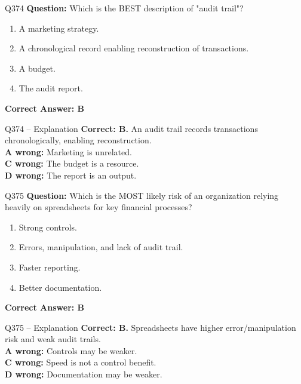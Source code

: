 \documentclass[aspectratio=169,10pt]{beamer}
\begin{document}
	\begin{frame}[t]{Q374}
		\small
		\textbf{Question:} Which is the BEST description of "audit trail"?
		\begin{enumerate}[label=\Alph*.,itemsep=1pt,topsep=2pt]
			\item A marketing strategy.
			\item A chronological record enabling reconstruction of transactions.
			\item A budget.
			\item The audit report.
		\end{enumerate}
		\vspace{4pt}
		\textbf{Correct Answer: B}
	\end{frame}
	
	\begin{frame}[t]{Q374 -- Explanation}
		\small
		\textbf{Correct: B.} An audit trail records transactions chronologically, enabling reconstruction. \\[4pt]
		\textbf{A wrong:} Marketing is unrelated. \\[2pt]
		\textbf{C wrong:} The budget is a resource. \\[2pt]
		\textbf{D wrong:} The report is an output.
	\end{frame}
	
	\begin{frame}[t]{Q375}
		\small
		\textbf{Question:} Which is the MOST likely risk of an organization relying heavily on spreadsheets for key financial processes?
		\begin{enumerate}[label=\Alph*.,itemsep=1pt,topsep=2pt]
			\item Strong controls.
			\item Errors, manipulation, and lack of audit trail.
			\item Faster reporting.
			\item Better documentation.
		\end{enumerate}
		\vspace{4pt}
		\textbf{Correct Answer: B}
	\end{frame}
	
	\begin{frame}[t]{Q375 -- Explanation}
		\small
		\textbf{Correct: B.} Spreadsheets have higher error/manipulation risk and weak audit trails. \\[4pt]
		\textbf{A wrong:} Controls may be weaker. \\[2pt]
		\textbf{C wrong:} Speed is not a control benefit. \\[2pt]
		\textbf{D wrong:} Documentation may be weaker.
	\end{frame}
	
\end{document}
